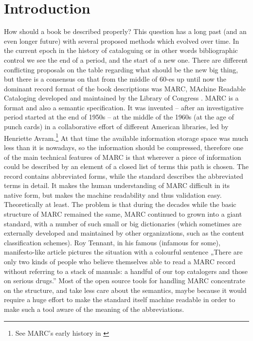 \section{Introduction}
How should a book be described properly? This question has a long past (and an even longer future) with several proposed methods which evolved over time. In the current epoch in the history of cataloguing or in other words bibliographic control we see the end of a period, and the start of a new one. There are different conflicting proposals on the table regarding what should be the new big thing, but there is a consensus on that from the middle of 60-es up until now the dominant record format of the book descriptions was MARC, MAchine Readable Cataloging developed and maintained by the Library of Congress \cite{marc21}. MARC is a format and also a semantic specification. It was invented -- after an investigative period started at the end of 1950s -- at the middle of the 1960s (at the age of punch cards) in a collaborative effort of different American libraries, led by Henriette Avram.\footnote{See MARC's early history in \cite{avram1975}} At that time the available information storage space was much less than it is nowadays, so the information should be compressed, therefore one of the main technical features of MARC is that wherever a piece of information could be described by an element of a closed list of terms this path is chosen. The record contains abbreviated forms, while the standard describes the abbreviated terms in detail. It makes the human understanding of MARC difficult in its native form, but makes the machine readability and thus validation easy. Theoretically at least. The problem is that during the decades while the basic structure of MARC remained the same, MARC continued to grown into a giant standard, with a number of such small or big dictionaries (which sometimes are externally developed and maintained by other organizations, such as the content classification schemes). Roy Tennant, in his famous (infamous for some), manifesto-like article \cite{tennant2002} pictures the situation with a colourful sentence „There are only two kinds of people who believe themselves able to read a MARC record without referring to a stack of manuals: a handful of our top catalogers and those on serious drugs.” Most of the open source tools for handling MARC concentrate on the structure, and take less care about the semantics, maybe because it would require a huge effort to make the standard itself machine readable in order to make such a tool aware of the meaning of the abbreviations.


